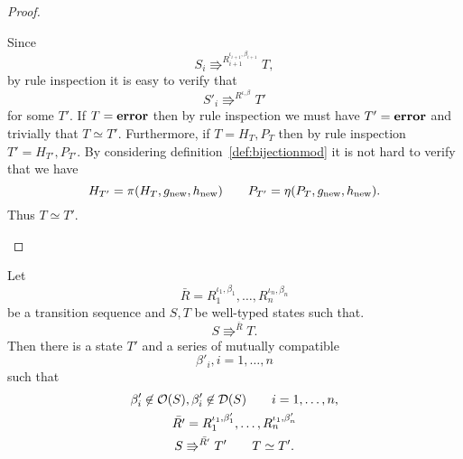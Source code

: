 \begin{proof}
\begin{description}
      Since
      \begin{equation}
        S_i \Rrightarrow^{R_{i+1}^{\iota_{i+1}, \beta_{i+1}}} T,
      \end{equation}
      by rule inspection it is easy to verify that
      \begin{equation}
        S'_i \Rrightarrow^{R^{\iota, \beta}} T'
      \end{equation}
      for some $T'$. If $T = \mbox{{\bf error}}$ then by rule inspection we must have $T' =
      \mbox{{\bf error}}$ and trivially that $T \simeq T'$. Furthermore, if $T = H_{T},
      P_{T}$ then by rule inspection $T' = H_{T'}, P_{T'}$. By considering
      definition~\ref{def:bijectionmod} it is not hard to verify that
      we have
      \begin{equation*}
        H_{T'} = \pi(H_T, g_{\text{new}}, h_{\text{new}}) \quad\quad P_{T'} =
        \eta(P_T, g_{\text{new}}, h_{\text{new}}).
      \end{equation*}
      Thus $T \simeq T'$.
  \end{description}
\end{proof}

\begin{lemma} \label{lem:lemma4}
  Let 
  \begin{equation*}
    \bar{R} = R_1^{\iota_1, \beta_1}, \dots, R_n^{\iota_n, \beta_n}
  \end{equation*}
  be a transition sequence and $S, T$ be well-typed states such that.
  \begin{equation*}
    S \Rrightarrow^{\bar{R}} T.
  \end{equation*}
  Then there is a state $T'$ and a series of mutually compatible 
  \begin{equation*}
    \beta'_i, i = 1, \dots, n
  \end{equation*}
  such that
  \begin{equation*}
    \begin{gathered}
      \beta'_i \not\in \mathcal{O}(S), \beta'_i \not\in \mathcal{D}(S) \quad\quad i =
      1, \dots, n, \\
      \bar{R'} = R_1^{\iota_1, \beta'_1}, \dots, R_n^{\iota_1, \beta'_n} \\
      S \Rrightarrow^{\bar{R'}} T' \quad\quad T \simeq T'.
    \end{gathered}
  \end{equation*}
\end{lemma}

